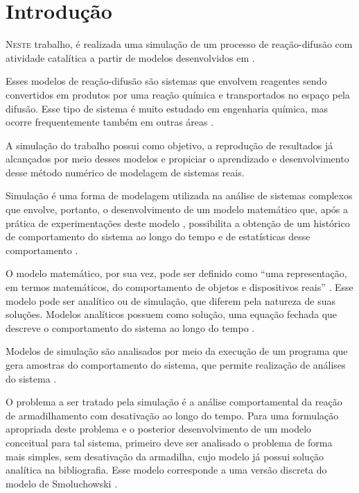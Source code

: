 
\section{Introdução}

\lettrine{N}{este} trabalho, é realizada uma simulação de um processo de
reação-difusão com atividade catalítica a partir de modelos desenvolvidos
em \cite{3}.

Esses modelos de reação-difusão são sistemas que envolvem reagentes sendo
convertidos em produtos por uma reação química e transportados no espaço pela
difusão. Esse tipo de sistema é muito estudado em engenharia química, mas ocorre
frequentemente também em outras áreas \cite{4}.

A simulação do trabalho possui como objetivo, a reprodução de resultados já
alcançados por meio desses modelos e propiciar o aprendizado e desenvolvimento
desse método numérico de modelagem de sistemas reais.

Simulação é uma forma de modelagem utilizada na análise de sistemas complexos
que envolve, portanto, o desenvolvimento de um modelo matemático que, após a
prática de experimentações deste modelo , possibilita a obtenção de um histórico
de comportamento do sistema ao longo do tempo e de estatísticas desse
comportamento \cite{1}.

O modelo matemático, por sua vez, pode ser definido como ``uma
representação, em termos matemáticos, do comportamento de objetos e dispositivos
reais'' \cite{2}. Esse modelo pode ser analítico ou de
simulação, que diferem pela natureza de suas soluções. Modelos analíticos
possuem como solução, uma equação fechada que descreve o comportamento do
sistema ao longo do tempo \cite{1}.

Modelos de simulação são analisados por meio da execução de um programa que
gera amostras do comportamento do sistema, que permite realização de análises
do sistema \cite{1}.

O problema a ser tratado pela simulação é a análise comportamental da reação de
armadilhamento com desativação ao longo do tempo. Para uma formulação apropriada
deste problema e o posterior desenvolvimento de um modelo conceitual para tal
sistema, primeiro deve ser analisado o problema de forma mais simples, sem
desativação da armadilha, cujo modelo já possui solução analítica na
bibliografia. Esse modelo corresponde a uma versão discreta do modelo de
Smoluchowski \cite{5}.

